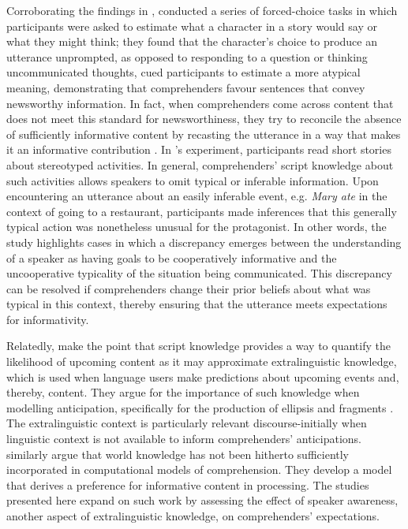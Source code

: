 \documentclass[output=paper,colorlinks,citecolor=brown]{langscibook}
\begin{document}
Corroborating the findings in \citet{RohdeLucas2021}, \citet{RohdeFranke2022} conducted a series of forced-choice tasks in which participants were asked to estimate what a character in a story would say or what they might think; they found that the character’s choice to produce an utterance unprompted, as opposed to responding to a question or thinking uncommunicated thoughts, cued participants to estimate a more atypical meaning, demonstrating that comprehenders favour sentences that convey newsworthy information. In fact, when comprehenders come across content that does not meet this standard for newsworthiness, they try to reconcile the absence of sufficiently informative content by recasting the utterance in a way that makes it an informative contribution \citep{KravtchenkoDemberg2022}. In \citeauthor{KravtchenkoDemberg2022}'s experiment, participants read short stories about stereotyped activities. In general, comprehenders’ script knowledge about such activities allows speakers to omit typical or inferable information. Upon encountering an utterance about an easily inferable event, e.g. \textit{Mary ate} in the context of going to a restaurant, participants made inferences that this generally typical action was nonetheless unusual for the protagonist. In other words, the study highlights cases in which a discrepancy emerges between the understanding of a speaker as having goals to be cooperatively informative and the uncooperative typicality of the situation being communicated. This discrepancy can be resolved if comprehenders change their prior beliefs about what was typical in this context, thereby ensuring that the utterance meets expectations for informativity. 
 
Relatedly, \citet{LemkeSchäferEtAl2021} make the point that script knowledge provides a way to quantify the likelihood of upcoming content as it may approximate extralinguistic knowledge, which is used when language users make predictions about upcoming events and, thereby, content. They argue for the importance of such knowledge when modelling anticipation, specifically for the production of ellipsis and fragments \citep{LemkeReichEtAl2021, SchäferEtAl2021}. The extralinguistic context is particularly relevant discourse-initially when linguistic context is not available to inform comprehenders’ anticipations. \citet{VenhuizenBrouwer2019} similarly argue that world knowledge has not been hitherto sufficiently incorporated in computational models of comprehension. They develop a model that derives a preference for informative content in processing. The studies presented here expand on such work by assessing the effect of speaker awareness, another aspect of extralinguistic knowledge, on comprehenders’ expectations.
 
\end{document}
